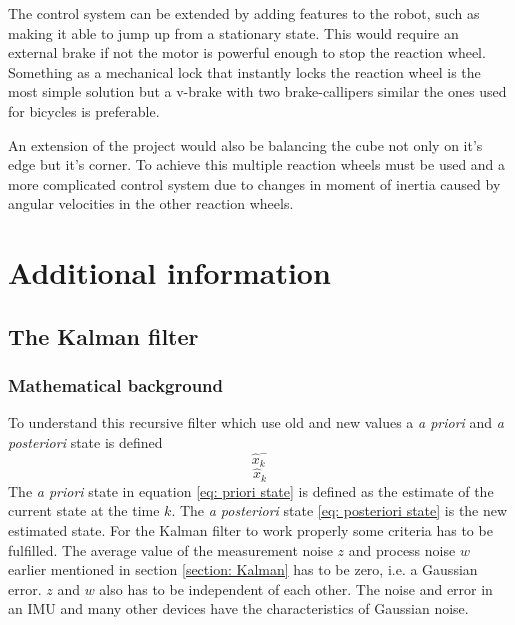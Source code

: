 \documentclass[a4paper,11pt]{kth-mag}
\begin{document}
The control system can be extended by adding features to the robot, such as making it able to jump up from a stationary state. This would require an external brake if not the motor is powerful enough to stop the reaction wheel. Something as a mechanical lock that instantly locks the reaction wheel is the most simple solution but a v-brake with two brake-callipers similar the ones used for bicycles is preferable. 

An extension of the project would also be balancing the cube not only on it's edge but it's corner. To achieve this multiple reaction wheels must be used and a more complicated control system due to changes in moment of inertia caused by angular velocities in the other reaction wheels.


%
\cleardoublepage


\cleardoublepage
\appendix
{}


\chapter{Additional information} \label{appA}
\section{The Kalman filter} \label{app: Kalman}
\subsection{Mathematical background}
To understand this recursive filter which use old and new values a \textit{a priori} and \textit{a posteriori} state is defined
\begin{equation} \label{eq: priori state}
\hat{x}^-_k
\end{equation}
\begin{equation} \label{eq: posteriori state}
\hat{x}_k
\end{equation}
The \textit{a priori}  state in equation \eqref{eq: priori state} is defined as the estimate of the current state at the time $k$. The \textit{a posteriori} state \eqref{eq: posteriori state} is the new estimated state.
For the Kalman filter to work properly some criteria has to be fulfilled. The average value of the measurement noise $z$ and process noise $w$ earlier mentioned in section \ref{section: Kalman} has to be zero, i.e. a Gaussian error. $z$ and $w$ also has to be independent of  each other. The noise and error in an IMU and many other devices have the characteristics of Gaussian noise.
\end{document}
